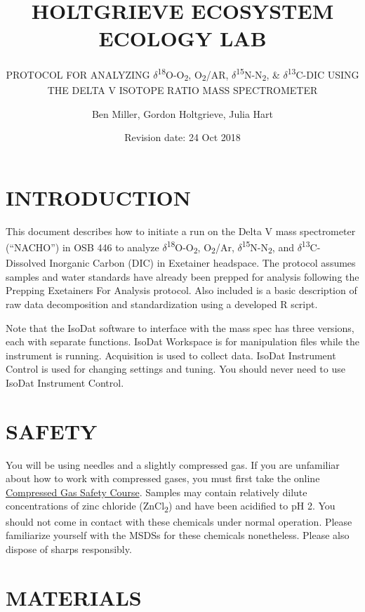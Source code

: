 \documentclass[]{article}
\title{HOLTGRIEVE ECOSYSTEM ECOLOGY LAB}
\subtitle{PROTOCOL FOR ANALYZING
\(\delta\)\textsuperscript{18}O-O\textsubscript{2},
O\textsubscript{2}/AR,
\(\delta\)\textsuperscript{15}N-N\textsubscript{2}, \&
\(\delta\)\textsuperscript{13}C-DIC USING THE DELTA V ISOTOPE RATIO MASS
SPECTROMETER}
\author{Ben Miller, Gordon Holtgrieve, Julia Hart}
\date{Revision date: 24 Oct 2018}
\begin{document}
\maketitle

\section{INTRODUCTION}\label{introduction}

This document describes how to initiate a run on the Delta V mass
spectrometer (``NACHO'') in OSB 446 to analyze
\(\delta\)\textsuperscript{18}O-O\textsubscript{2},
O\textsubscript{2}/Ar,
\(\delta\)\textsuperscript{15}N-N\textsubscript{2}, and
\(\delta\)\textsuperscript{13}C-Dissolved Inorganic Carbon (DIC) in
Exetainer headspace. The protocol assumes samples and water standards
have already been prepped for analysis following the Prepping Exetainers
For Analysis protocol. Also included is a basic description of raw data
decomposition and standardization using a developed R script.

Note that the IsoDat software to interface with the mass spec has three
versions, each with separate functions. IsoDat Workspace is for
manipulation files while the instrument is running. Acquisition is used
to collect data. IsoDat Instrument Control is used for changing settings
and tuning. You should never need to use IsoDat Instrument Control.

\section{SAFETY}\label{safety}

You will be using needles and a slightly compressed gas. If you are
unfamiliar about how to work with compressed gases, you must first take
the online
\href{https://www.ehs.washington.edu/training/compressed-gas-safety-online}{Compressed
Gas Safety Course}. Samples may contain relatively dilute concentrations
of zinc chloride (ZnCl\textsubscript{2}) and have been acidified to pH
2. You should not come in contact with these chemicals under normal
operation. Please familiarize yourself with the MSDSs for these
chemicals nonetheless. Please also dispose of sharps responsibly.

\section{MATERIALS}\label{materials}
\end{document}
